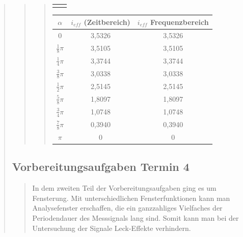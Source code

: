 \begin{quote}
\begin{quote}
\begin{quote}
\begin{center}
\begin{tabular}{ll}
\begin{minipage}{0.6\textwidth}
                    \end{minipage}
    
                \end{tabular}
                \end{center}
                 \begin{center}
                     \begin{tabular}{|c|c|c|}
                                 
                       \hline
                       $\alpha $ & $i_{eff}$ (Zeitbereich) & $i_{eff}$ Frequenzbereich\\ \hline
                       $0$ & 3,5326 & 3,5326 \\ \hline
                       $\frac{1}{8} \pi$ & 3,5105 & 3,5105 \\ \hline
                       $\frac{1}{4} \pi$ & 3,3744 & 3,3744 \\ \hline
                       $\frac{3}{8} \pi$ & 3,0338 & 3,0338 \\ \hline
                       $\frac{1}{2} \pi$ & 2,5145 & 2,5145 \\ \hline
                       $\frac{5}{8} \pi$ & 1,8097 & 1,8097 \\ \hline
                       $\frac{3}{4} \pi$ & 1,0748 & 1,0748 \\ \hline
                       $\frac{7}{8} \pi$ & 0,3940 & 0,3940 \\ \hline
                       $ \pi$ & 0 & 0 \\ \hline
                             
               
                     \end{tabular}
                 \end{center}        
        \end{quote}
    \end{quote}
    \subsection{Vorbereitungsaufgaben Termin 4}
    \begin{quote}
        In dem zweiten Teil der Vorbereitungsaufgaben ging es um Fensterung. Mit
        unterschiedlichen Fensterfunktionen kann man Analysefenster erschaffen,
        die ein ganzzahliges Vielfaches der Periodendauer des Messsignals lang
        sind. Somit kann man bei der Untersuchung der Signale Leck-Effekte
        verhindern.\\
       

\end{quote}
\end{quote}
